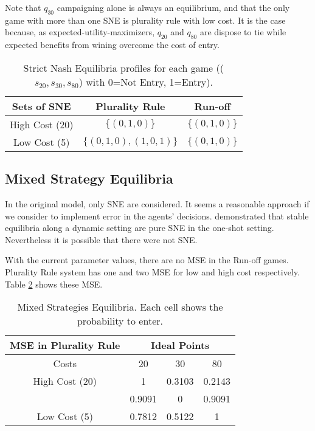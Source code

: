 Note that $q_{30}$ campaigning alone is always an equilibrium, and that the only game with more than one SNE is plurality rule with low cost. It is the case because, as expected-utility-maximizers, $q_{20}$ and $q_{80}$ are dispose to tie while expected benefits from wining overcome the cost of entry.

\begin{table}
	\centering
	\begin{tabular}{c c c}
		\hline Sets of SNE	 & Plurality Rule 		& Run-off \\\hline 
		High Cost (20) & $\{(0,1,0)\}$ & $\{(0,1,0)\}$ \\ 
		Low Cost (5) & $\{(0,1,0),(1,0,1)\}$ &  $\{(0,1,0)\}$\\\hline 
	\end{tabular}\caption[Nash Equilibria]{Strict Nash Equilibria profiles for each game (($s_{20}, s_{30}, s_{80}$) with 0=Not Entry, 1=Entry). }\label{NE}
\end{table}

\subsection{Mixed Strategy Equilibria}

In the original model, only SNE are considered. It seems a reasonable approach if we consider to implement error in the agents' decisions.  demonstrated that stable equilibria along a dynamic setting are pure SNE in the one-shot setting. Nevertheless it is possible that there were not SNE. 
 
With the current parameter values, there are no MSE in the Run-off games. Plurality Rule system has one and two MSE for low and high cost respectively. Table \ref{MSE} shows these MSE. 

\begin{table}
	\centering
	\begin{tabular}{c c c c}
		\hline
		MSE in Plurality Rule & \multicolumn{3}{c}{Ideal Points} \\\hline 
		Costs 			& 20 & 30 & 80 \\\hline 
		High Cost (20) 	& 1 & 0.3103 & 0.2143 \\ 
		& 0.9091 & 0 & 0.9091 \\\hline 
		Low Cost (5) & 0.7812 & 0.5122 & 1 \\\hline 
	\end{tabular}\caption[Nash Equilibria]{Mixed Strategies Equilibria. Each cell shows the probability to enter.}\label{MSE}
\end{table}

